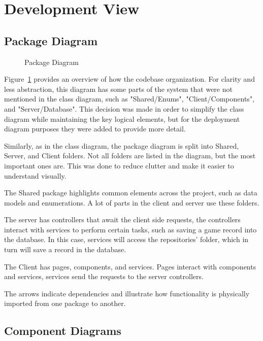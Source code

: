 \documentclass[11pt,a4paper]{article}
\newcommand{\inputdiagram}[1]{}
\newcommand{\textwidthdiagram}[2][1]{%
  \resizebox{#1\textwidth}{!}{\inputdiagram{#2}}%
}
\begin{document}
\section{Development View}

\subsection{Package Diagram}

\begin{figure}[H]
    \centering
    \textwidthdiagram{Package_Diagram.latex}
    \caption{Package Diagram} 
    \label{fig:united_package}
\end{figure}

Figure~\ref{fig:united_package} provides an overview of how the codebase organization. For clarity and less abstraction, this diagram has some parts of the system that were not mentioned in the class diagram, such as "Shared/Enums", "Client/Components", and "Server/Database". This decision was made in order to simplify the class diagram while maintaining the key logical elements, but for the deployment diagram purposes they were added to provide more detail.

Similarly, as in the class diagram, the package diagram is split into Shared, Server, and Client folders. Not all folders are listed in the diagram, but the most important ones are. This was done to reduce clutter and make it easier to understand visually.

The Shared package highlights common elements across the project, such as data models and enumerations. A lot of parts in the client and server use these folders.

The server has controllers that await the client side requests, the controllers interact with services to perform certain tasks, such as saving a game record into the database. In this case, services will access the repositories' folder, which in turn will save a record in the database.

The Client has pages, components, and services. Pages interact with components and services, services send the requests to the server controllers.

The arrows indicate dependencies and illustrate how functionality is physically imported from one package to another.

\subsection{Component Diagrams}
\end{document}
